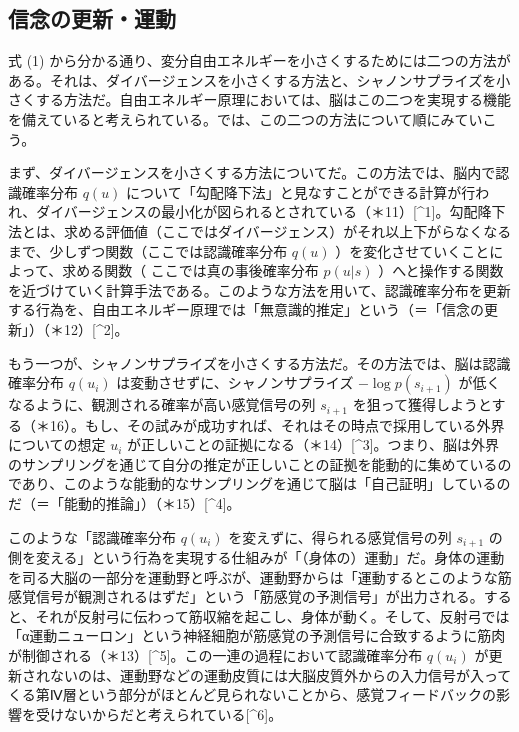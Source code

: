 \subsection{信念の更新・運動}\label{ux4fe1ux5ff5ux306eux66f4ux65b0ux904bux52d5}

式 (1)
から分かる通り、変分自由エネルギーを小さくするためには二つの方法がある。それは、ダイバージェンスを小さくする方法と、シャノンサプライズを小さくする方法だ。自由エネルギー原理においては、脳はこの二つを実現する機能を備えていると考えられている。では、この二つの方法について順にみていこう。

まず、ダイバージェンスを小さくする方法についてだ。この方法では、脳内で認識確率分布
\(q(u)\)
について「勾配降下法」と見なすことができる計算が行われ、ダイバージェンスの最小化が図られるとされている（＊11）{[}\^{}1{]}。勾配降下法とは、求める評価値（ここではダイバージェンス）がそれ以上下がらなくなるまで、少しずつ関数（ここでは認識確率分布
\(q(u)\) ）を変化させていくことによって、求める関数（
ここでは真の事後確率分布 \(p(u|s)\)
）へと操作する関数を近づけていく計算手法である。このような方法を用いて、認識確率分布を更新する行為を、自由エネルギー原理では「無意識的推定」という（＝「信念の更新」）（＊12）{[}\^{}2{]}。

もう一つが、シャノンサプライズを小さくする方法だ。その方法では、脳は認識確率分布
\(q(u_i)\) は変動させずに、シャノンサプライズ \(-\log{p(s_{i+1})}\)
が低くなるように、観測される確率が高い感覚信号の列 \(s_{i+1}\)
を狙って獲得しようとする（＊16）。もし、その試みが成功すれば、それはその時点で採用している外界についての想定
\(u_i\)
が正しいことの証拠になる（＊14）{[}\^{}3{]}。つまり、脳は外界のサンプリングを通じて自分の推定が正しいことの証拠を能動的に集めているのであり、このような能動的なサンプリングを通じて脳は「自己証明」しているのだ（＝「能動的推論」）（＊15）{[}\^{}4{]}。

このような「認識確率分布 \(q(u_i)\) を変えずに、得られる感覚信号の列
\(s_{i+1}\)
の側を変える」という行為を実現する仕組みが「（身体の）運動」だ。身体の運動を司る大脳の一部分を運動野と呼ぶが、運動野からは「運動するとこのような筋感覚信号が観測されるはずだ」という「筋感覚の予測信号」が出力される。すると、それが反射弓に伝わって筋収縮を起こし、身体が動く。そして、反射弓では「α運動ニューロン」という神経細胞が筋感覚の予測信号に合致するように筋肉が制御される（＊13）{[}\^{}5{]}。この一連の過程において認識確率分布
\(q(u_i)\)
が更新されないのは、運動野などの運動皮質には大脳皮質外からの入力信号が入ってくる第Ⅳ層という部分がほとんど見られないことから、感覚フィードバックの影響を受けないからだと考えられている{[}\^{}6{]}。


